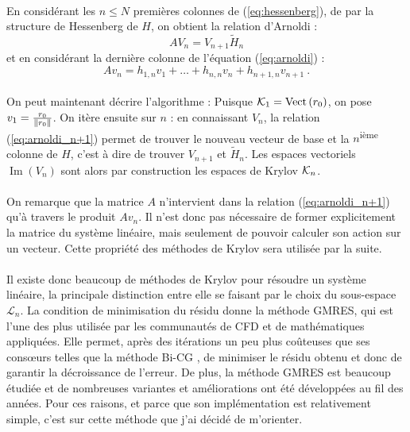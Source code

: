 	\paragraph{}
	En considérant les $n \le N$ premières colonnes de (\ref{eq:hessenberg}), de par la structure de Hessenberg de $H$, on obtient la relation d'Arnoldi :
	\begin{equation}\label{eq:arnoldi}
		AV_n = V_{n+1}\widetilde{H}_n
	\end{equation}
	et en considérant la dernière colonne de l'équation (\ref{eq:arnoldi}) :
	\begin{equation}\label{eq:arnoldi_n+1}
		Av_n = h_{1,n}v_1 + \dots + h_{n,n}v_n + h_{n+1,n}v_{n+1}\ .
	\end{equation}

	\paragraph{}
	On peut maintenant décrire l'algorithme :
	Puisque $\krylov{1} = \operatorname{Vect}\left(r_0\right)$, on pose $v_1 = \frac{r_0}{\norm{r_0}}$.
	On itère ensuite sur $n$ : en connaissant $V_n$, la relation (\ref{eq:arnoldi_n+1}) permet de trouver le nouveau vecteur de base et la $n$\textsuperscript{ième} colonne de $H$, c'est à dire de trouver $V_{n+1}$ et $\widetilde{H}_n$.
	Les espaces vectoriels $\operatorname{Im}\left(V_n\right)$ sont alors par construction les espaces de Krylov $\krylov{n}$.

	\paragraph{}
	On remarque que la matrice $A$ n'intervient dans la relation (\ref{eq:arnoldi_n+1}) qu'à travers le produit $Av_n$.
	Il n'est donc pas nécessaire de former explicitement la matrice du système linéaire, mais seulement de pouvoir calculer son action sur un vecteur.
	Cette propriété des méthodes de Krylov sera utilisée par la suite.

	\paragraph{}
	Il existe donc beaucoup de méthodes de Krylov pour résoudre un système linéaire, la principale distinction entre elle se faisant par le choix du sous-espace $\mathcal{L}_n$.
	La condition de minimisation du résidu donne la méthode GMRES, qui est l'une des plus utilisée par les communautés de CFD et de mathématiques appliquées.
	Elle permet, après des itérations un peu plus coûteuses que ses consœurs telles que la méthode Bi-CG \cite{TrefethenBau1997}, de minimiser le résidu obtenu et donc de garantir la décroissance de l'erreur.
	De plus, la méthode GMRES est beaucoup étudiée et de nombreuses variantes et améliorations ont été développées au fil des années.
	Pour ces raisons, et parce que son implémentation est relativement simple, c'est sur cette méthode que j'ai décidé de m'orienter.


